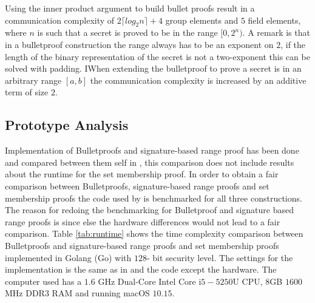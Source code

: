 Using the inner product argument to build bullet proofs result in a communication complexity of $2\lceil log_2 n \rceil +4$ group elements and $5$ field elements, where $n$ is such that a secret is proved to be in the range $[0,2^n)$.  A remark is that in a bulletproof construction the range always has to be an exponent on $2$, if the length of the binary representation of the secret is not a two-exponent this can be solved with padding. IWhen extending the bulletproof to prove a secret is in an arbitrary range $[a,b]$ the communication complexity is increased by an additive term of size $2$.  

\subsection{Prototype Analysis}
\label{sec:PrototypeAnalysis}
Implementation of Bulletproofs and signature-based range proof has been done  and compared between them self in \cite{RANGE-SET}, this comparison does not include results about the runtime for the set membership proof. In order to obtain a fair comparison between Bulletproofs, signature-based range proofs and set membership proofs the code used by \cite{RANGE-SET} is benchmarked for all three constructions. The reason for redoing the benchmarking for Bulletproof and signature based range proofs is since else the hardware differences would not lead to a fair comparison. Table \ref{tab:runtime} shows the time complexity comparison between Bulletproofs and signature-based range proofs and set membership proofs implemented in Golang (Go) with $128$- bit security level.  The settings for the implementation is the same as in \cite{RANGE-SET}  and the code \cite{Git:RP} except the hardware. 
The computer used has a $1.6$ GHz Dual-Core Intel Core i$5-5250$U CPU, $8$GB $1600$ MHz DDR3 RAM  and running macOS $10.15$. 



